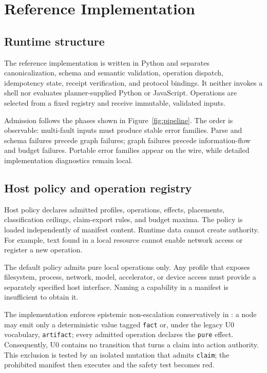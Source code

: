\section{Reference Implementation}
\label{sec:implementation}

\subsection{Runtime structure}
The reference implementation is written in Python and separates canonicalization, schema and semantic validation, operation dispatch, idempotency state, receipt verification, and protocol bindings. It neither invokes a shell nor evaluates planner-supplied Python or JavaScript. Operations are selected from a fixed registry and receive immutable, validated inputs.

Admission follows the phases shown in Figure~\ref{fig:pipeline}. The order is observable: multi-fault inputs must produce stable error families. Parse and schema failures precede graph failures; graph failures precede information-flow and budget failures. Portable error families appear on the wire, while detailed implementation diagnostics remain local.

\subsection{Host policy and operation registry}
Host policy declares admitted profiles, operations, effects, placements, classification ceilings, claim-export rules, and budget maxima. The policy is loaded independently of manifest content. Runtime data cannot create authority. For example, text found in a local resource cannot enable network access or register a new operation.

The default \Uzero policy admits pure local operations only. Any profile that exposes filesystem, process, network, model, accelerator, or device access must provide a separately specified host interface. Naming a capability in a manifest is insufficient to obtain it.

The implementation enforces epistemic non-escalation conservatively in \Uzero: a node may emit only a deterministic value tagged \texttt{fact} or, under the legacy U0 vocabulary, \texttt{artifact}; every admitted operation declares the \texttt{pure} effect. Consequently, U0 contains no transition that turns a claim into action authority. This exclusion is tested by an isolated mutation that admits \texttt{claim}; the prohibited manifest then executes and the safety test becomes red.

